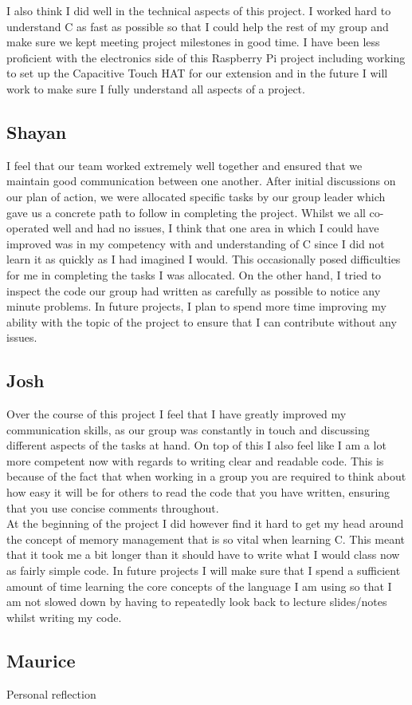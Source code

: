 \documentclass[11pt]{article}
\begin{document}
 I also think I did well in the technical aspects of this project. I worked hard to understand C as fast as possible so that I could help the rest of my group and make sure we kept meeting project milestones in good time. I have been less proficient with the electronics side of this Raspberry Pi project including working to set up the Capacitive Touch HAT for our extension and in the future I will work to make sure I fully understand all aspects of a project.

\subsection{Shayan}
I feel that our team worked extremely well together and ensured that we maintain good communication between one another. After initial discussions on our plan of action, we were allocated specific tasks by our group leader which gave us a concrete path to follow in completing the project. Whilst we all co-operated well and had no issues, I think that one area in which I could have improved was in my competency with and understanding of C since I did not learn it as quickly as I had imagined I would. This occasionally posed difficulties for me in completing the tasks I was allocated. On the other hand, I tried to inspect the code our group had written as carefully as possible to notice any minute problems. In future projects, I plan to spend more time improving my ability with the topic of the project to ensure that I can contribute without any issues.  


\subsection{Josh}
Over the course of this project I feel that I have greatly improved my communication skills, as our group was constantly in touch and discussing different aspects of the tasks at hand. On top of this I also feel like I am a lot more competent now with regards to writing clear and readable code. This is because of the fact that when working in a group you are required to think about how easy it will be for others to read the code that you have written, ensuring that you use concise comments throughout. \\

At the beginning of the project I did however find it hard to get my head around the concept of memory management that is so vital when learning C. This meant that it took me a bit longer than it should have to write what I would class now as fairly simple code. In future projects I will make sure that I spend a sufficient amount of time learning the core concepts of the language I am using so that I am not slowed down by having to repeatedly look back to lecture slides/notes whilst writing my code.

\subsection{Maurice}
Personal reflection
\end{document}

